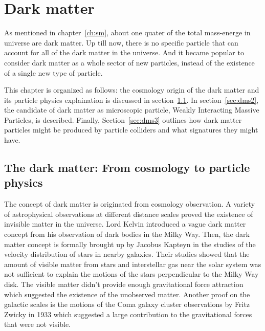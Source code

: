 \chapter{Dark matter}
\label{ch:dm}
\par As mentioned in chapter~\ref{ch:sm}, about one quater of the total mass-energe in universe are dark matter. Up till now, there is no specific particle that can account for all of the dark matter in the universe. And it became popular to consider dark matter as a whole sector of new particles, instead of the existence of a single new type of particle.

\par This chapter is organized as follows: the cosmology origin of the dark matter and its particle physics explaination is discussed in section~\ref{sec:dms1}. In section~\ref{sec:dms2}, the candidate of dark matter as microscopic particle, Weakly Interacting Massive Particles, is described. Finally, Section~\ref{sec:dms3} outlines how dark matter particles might be produced by particle colliders and what signatures they might have.

\section{The dark matter: From cosmology to particle physics}
\label{sec:dms1}

\par The concept of dark matter is originated from cosmology observation. A variety of astrophysical observations at different distance scales proved the existence of invisible matter in the universe. Lord Kelvin introduced a vague dark matter concept from his observation of dark bodies in the Milky Way. Then, the dark matter concept is formally brought up by Jacobus Kapteyn in the studies of the velocity distribution of stars in nearby galaxies\cite{Kapteyn:1922zz}. Their studies showed that the amount of visible matter from stars and interstellar gas near the solar system was not sufficient to explain the motions of the stars perpendicular to the Milky Way disk. The visible matter didn't provide enough gravitational force attraction which suggested the existence of the unobserved matter. Another proof on the galactic scales is the motions of the Coma galaxy cluster observations by Fritz Zwicky in 1933\cite{Zwicky:1933gu} which suggested a large contribution to the gravitational forces that were not visible.

